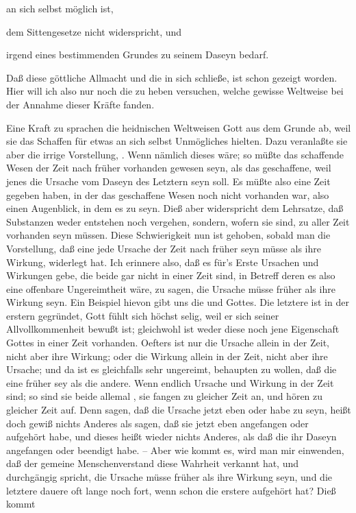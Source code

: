 \begin{aufza}
\begin{inparaenum}[a)]
\item an sich selbst möglich ist,
\item dem Sittengesetze nicht widerspricht, und
\item irgend eines bestimmenden Grundes zu seinem Daseyn bedarf.
\end{inparaenum}
\item Daß diese göttliche Allmacht  und die  in sich schließe, ist schon gezeigt worden. Hier will ich also nur noch die  zu heben versuchen, welche gewisse Weltweise bei der Annahme dieser Kräfte fanden.
\begin{aufzb} 
\item Eine Kraft zu  sprachen die heidnischen Weltweisen Gott aus dem Grunde ab, weil sie das Schaffen für etwas an sich selbst Unmögliches hielten. Dazu veranlaßte sie aber die irrige Vorstellung, . Wenn nämlich dieses wäre; so müßte das schaffende Wesen der Zeit nach früher vorhanden gewesen seyn, als das geschaffene, weil jenes die Ursache vom Daseyn des Letztern seyn soll. Es müßte also eine Zeit gegeben haben, in der das geschaffene Wesen noch nicht vorhanden war, also einen Augenblick, in dem es  zu seyn. Dieß aber widerspricht dem Lehrsatze, daß Substanzen weder entstehen noch vergehen, sondern, wofern sie sind, zu aller Zeit vorhanden seyn müssen. Diese Schwierigkeit nun ist gehoben, sobald man die Vorstellung, daß eine jede Ursache der Zeit nach früher seyn müsse als ihre Wirkung, widerlegt hat. Ich erinnere also, daß es für's Erste Ursachen und Wirkungen gebe, die beide gar nicht in einer Zeit sind, in Betreff deren es also eine offenbare Ungereimtheit wäre, zu sagen, die Ursache müsse früher als ihre Wirkung seyn. Ein Beispiel hievon gibt uns die  und  Gottes. Die letztere ist in der erstern gegründet, Gott fühlt sich höchst selig, weil er sich seiner Allvollkommenheit bewußt ist; gleichwohl ist weder diese noch jene Eigenschaft Gottes in einer Zeit vorhanden. Oefters ist nur die Ursache allein in der Zeit, nicht aber ihre Wirkung; oder die Wirkung allein in der Zeit, nicht aber ihre Ursache; und da ist es gleichfalls sehr ungereimt, behaupten zu wollen, daß die eine früher sey als die andere. Wenn endlich Ursache und Wirkung  in der Zeit sind; so sind sie beide allemal , sie fangen zu gleicher Zeit an, und hören zu gleicher Zeit auf. Denn sagen, daß die Ursache jetzt eben  oder  habe zu seyn, heißt doch gewiß nichts Anderes als sagen, daß sie jetzt eben  angefangen oder aufgehört habe, und dieses heißt wieder nichts Anderes, als daß die  ihr Daseyn angefangen oder beendigt habe. -- Aber wie kommt es, wird man mir einwenden, daß der gemeine Menschenverstand diese Wahrheit verkannt hat, und durchgängig spricht, die Ursache müsse früher als ihre Wirkung seyn, und die letztere dauere oft lange noch fort, wenn schon die erstere aufgehört hat? Dieß kommt 
\end{aufzb}
\end{aufza}
